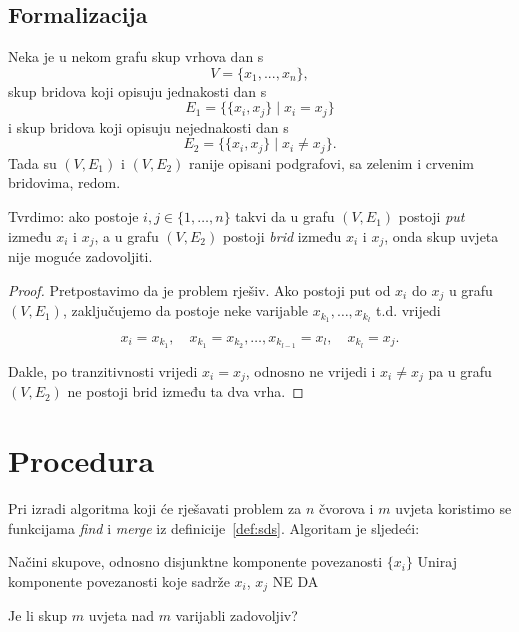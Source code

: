 \documentclass[12pt]{scrartcl}
\makeatletter
\newenvironment{algoritam}[1][htb]{%
    \renewcommand{\ALG@name}{Algoritam}%
   \begin{algorithm}[#1]%
  }{\end{algorithm}}
\makeatother
\begin{document}
\subsection{Formalizacija}
\begin{tvrdnja}
Neka je u nekom grafu skup vrhova dan s
\[V=\{x_1,...,x_n\},\]
skup bridova koji opisuju jednakosti dan s
\[E_1=\{\{x_i,x_j\} \mid x_i=x_j\}\]
i skup bridova koji opisuju nejednakosti dan s
\[E_2=\{\{x_i,x_j\} \mid x_i\neq x_j\}.\]
Tada su $(V,E_1)$ i $(V,E_2)$ ranije opisani podgrafovi, sa zelenim i crvenim bridovima, redom. 

Tvrdimo: ako postoje $i,j\in\{1,\dotsc,n\}$ takvi da u grafu $(V,E_1)$ postoji \emph{put} između $x_i$ i $x_j$, a u grafu $(V,E_2)$ postoji \emph{brid} između $x_i$ i $x_j$, onda skup uvjeta nije moguće zadovoljiti.
\end{tvrdnja}

\begin{proof}
Pretpostavimo da je problem rješiv. Ako postoji put od $x_i$ do $x_j$ u grafu $(V,E_1)$, zaključujemo da postoje neke varijable $x_{k_1},\dotsc,x_{k_l}$ t.d. vrijedi

\[x_i=x_{k_1},\quad x_{k_1}=x_{k_2}, \dotsc, x_{k_{l-1}}=x_l,\quad x_{k_l}=x_j.\]

Dakle, po tranzitivnosti vrijedi $x_i=x_j$, odnosno ne vrijedi i $x_i\neq x_j$ pa u grafu $(V,E_2)$ ne postoji brid između ta dva vrha.
\end{proof}

\section{Procedura}

Pri izradi algoritma koji će rješavati problem za $n$ čvorova i $m$ uvjeta koristimo se funkcijama \textsl{find} i \textsl{merge} iz definicije~\ref{def:sds}. Algoritam je sljedeći:

\begin{algoritam}
\begin{algorithmic}\label{alg:zadovoljiv}
    \State Načini skupove, odnosno disjunktne komponente povezanosti $\{x_i\}$
\EndFor
{}
    \State Uniraj komponente povezanosti koje sadrže $x_i$, $x_j$
\EndFor
{}
        \Return NE
    \EndIf
\EndFor
\Return DA
\end{algorithmic}
\caption{Je li skup $m$ uvjeta nad $m$ varijabli zadovoljiv?}
\end{algoritam}
\end{document}
